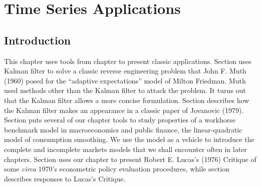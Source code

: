 %
%


\chapter{Time Series Applications\label{timeseriesapp}}
\def\toone{{t+1}}
\def\ttwo{{t+2}}
\def\tthree{{t+3}}
\def\Tone{{T+1}}
\def\TTT{{T-1}}
\def\rtr{{\rm tr}}
\def\epigraph#1#2{%
\begingroup
\smallskip
\leftskip=2em
\rightskip=0pt plus2em
\it\noindent #1\par
\noindent --- #2\par
\endgroup\noindent}
%
\def\frac#1#2{#1\over #2}
%


\section{Introduction}

This chapter uses tools from chapter  to present classic applications.
  Section  uses
Kalman filter to solve a  classic reverse engineering problem that John F. Muth (1960)  posed for the ``adaptive expectations''  model of
Milton Friedman.  Muth used   methods other than the Kalman filter  to attack the problem.  It turns out that the Kalman
filter allows a more concise formulation. Section  describes  how the Kalman filter makes an appearance  in
a classic paper of Jovanovic (1979). Section  puts several of our chapter   tools to
study properties of  a workhorse benchmark model in macroeconomics
and public finance, the linear-quadratic model of consumption smoothing.  We use the model as a vehicle  to introduce the complete and incomplete markets models that we shall
encounter often in later chapters. Section  uses our chapter  to present Robert E. Lucas's (1976)
Critique of some {\it circa\/} 1970's econometric policy evaluation procedures, while section  describes   responses
to  Lucas's Critique.
%
%
%
%


\vfil\eject

